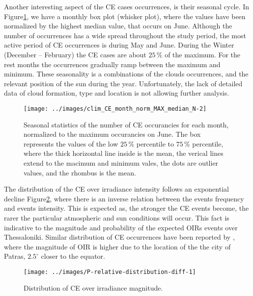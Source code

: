 \documentclass[preprint, 3p,
authoryear]{elsarticle} %
\begin{document}
Another interesting aspect of the CE cases occurrences, is their
seasonal cycle. In
Figure\nobreakspace{}\ref{fig:relative-month-occurancies}, we have a
monthly box plot (whisker plot), where the values have been normalized
by the highest median value, that occurs on June. Although the number of
occurrences has a wide spread throughout the study period, the most
active period of CE occurrences is during May and June. During the
Winter (December -- February) the CE cases are about \(25\,\%\) of the
maximum. For the rest months the occurrences gradually ramp between the
maximum and minimum. These seasonality is a combinations of the clouds
occurrences, and the relevant position of the sun during the year.
Unfortunately, the lack of detailed data of cloud formation, type and
location is not allowing further analysis.

\begin{figure}

{\centering \texttt{[image: ../images/clim\_CE\_month\_norm\_MAX\_median\_N-2]} 

}

\caption{Seasonal statistics of the number of CE occurancies for each month, normalized to the maximum occurancies on June. The box represents the values of the low $25\,\%$ percentile to $75\,\%$ percentile, where the thick horizontal line inside is the mean, the verical lines extend to the macimum and minimum vales, the dots are outlier values, and the rhombus is the mean.}\label{fig:relative-month-occurancies}
\end{figure}

The distribution of the CE over irradiance intensity follows an
exponential decline Figure\nobreakspace{}\ref{fig:ovir-distribution},
where there is an inverse relation between the events frequency and
events intensity. This is expected as, the stronger the CE events
become, the rarer the particular atmospheric and sun conditions will
occur. This fact is indicative to the magnitude and probability of the
expected OIRs events over Thessaloniki. Similar distribution of CE
occurrences have been reported by \citet{Vamvakas2020}, where the
magnitude of OIR is higher due to the location of the the city of
Patras, \(2.5^\circ\) closer to the equator.

\begin{figure}

{\centering \texttt{[image: ../images/P-relative-distribution-diff-1]} 

}

\caption{Distribution of CE over irradiance magnitude.}\label{fig:ovir-distribution}
\end{figure}
\end{document}
